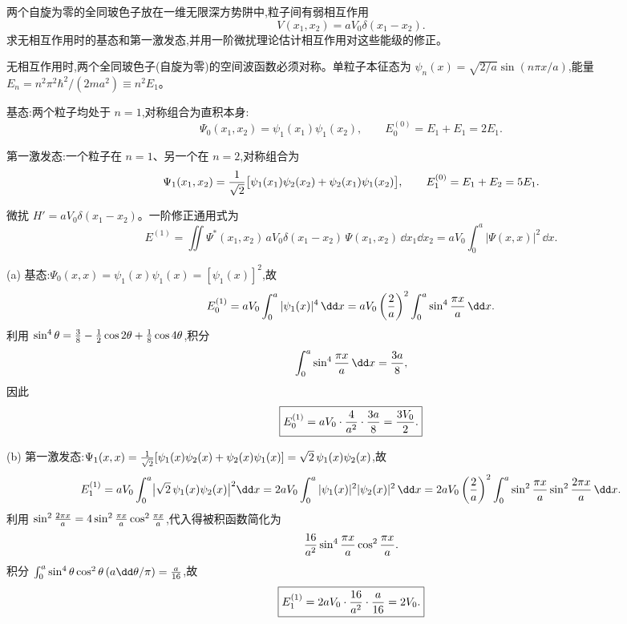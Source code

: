 \begin{question}
两个自旋为零的全同玻色子放在一维无限深方势阱中,粒子间有弱相互作用
\[
V(x_1,x_2)=aV_0\delta(x_1-x_2).
\]
求无相互作用时的基态和第一激发态,并用一阶微扰理论估计相互作用对这些能级的修正。
\end{question}
\begin{solution}
无相互作用时,两个全同玻色子(自旋为零)的空间波函数必须对称。单粒子本征态为 $\psi_n(x)=\sqrt{2/a}\sin(n\pi x/a)$,能量 $E_n=n^2\pi^2\hbar^2/(2ma^2)\equiv n^2E_1$。

基态:两个粒子均处于 $n=1$,对称组合为直积本身:
\[
\Psi_0(x_1,x_2)=\psi_1(x_1)\psi_1(x_2),\qquad
E_0^{(0)}=E_1+E_1=2E_1.
\]

第一激发态:一个粒子在 $n=1$、另一个在 $n=2$,对称组合为
\[
\Psi_1(x_1,x_2)={1\over\sqrt2}\bigl[\psi_1(x_1)\psi_2(x_2)+\psi_2(x_1)\psi_1(x_2)\bigr],
\qquad
E_1^{(0)}=E_1+E_2=5E_1.
\]

微扰 $H'=aV_0\delta(x_1-x_2)$。一阶修正通用式为
\[
E^{(1)}=\iint \Psi^*(x_1,x_2)\,aV_0\delta(x_1-x_2)\,\Psi(x_1,x_2)\,\dd x_1\dd x_2
=aV_0\int_0^a |\Psi(x,x)|^2\,\dd x.
\]

(a) 基态:$\Psi_0(x,x)=\psi_1(x)\psi_1(x)=[\psi_1(x)]^2$,故
\[
E_0^{(1)}=aV_0\int_0^a |\psi_1(x)|^4\,\dd x
=aV_0\left({2\over a}\right)^2\int_0^a \sin^4{\pi x\over a}\,\dd x.
\]
利用 $\sin^4\theta={3\over8}-{1\over2}\cos2\theta+{1\over8}\cos4\theta$,积分
\[
\int_0^a \sin^4{\pi x\over a}\,\dd x={3a\over8},
\]
因此
\[
\boxed{E_0^{(1)}=aV_0\cdot{4\over a^2}\cdot{3a\over8}={3V_0\over2}.}
\]

(b) 第一激发态:$\Psi_1(x,x)={1\over\sqrt2}[\psi_1(x)\psi_2(x)+\psi_2(x)\psi_1(x)]=\sqrt2\,\psi_1(x)\psi_2(x)$,故
\[
E_1^{(1)}=aV_0\int_0^a \bigl|\sqrt2\,\psi_1(x)\psi_2(x)\bigr|^2\dd x
=2aV_0\int_0^a |\psi_1(x)|^2|\psi_2(x)|^2\,\dd x
=2aV_0\left({2\over a}\right)^2\int_0^a \sin^2{\pi x\over a}\sin^2{2\pi x\over a}\,\dd x.
\]
利用 $\sin^2{2\pi x\over a}=4\sin^2{\pi x\over a}\cos^2{\pi x\over a}$,代入得被积函数简化为
\[
{16\over a^2}\sin^4{\pi x\over a}\cos^2{\pi x\over a}.
\]
积分 $\int_0^a\sin^4\theta\cos^2\theta\,(a\dd\theta/\pi)={a\over16}$,故
\[
\boxed{E_1^{(1)}=2aV_0\cdot{16\over a^2}\cdot{a\over16}=2V_0.}
\]
\end{solution}

